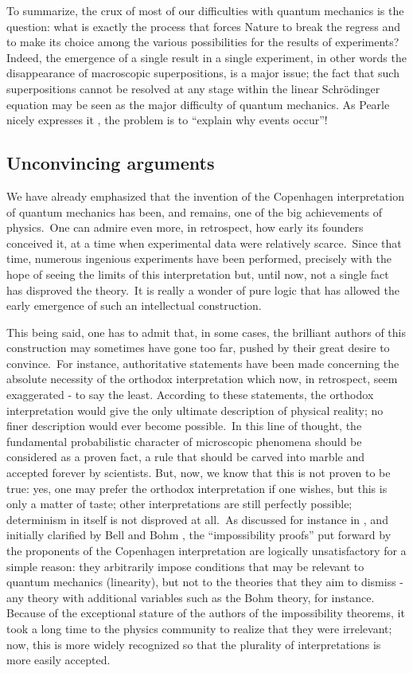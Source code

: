 \documentclass[12pt,onecolumn]{article}%
\begin{document}
To summarize, the crux of most of our difficulties with quantum mechanics is
the question: what is exactly the process that forces Nature to break the
regress and to make its choice among the various possibilities for the results
of experiments? Indeed, the emergence of a single result in a single
experiment, in other words the disappearance of macroscopic superpositions, is
a major issue; the fact that such superpositions cannot be resolved at any
stage within the linear Schr\"{o}dinger equation may be seen as the major
difficulty of quantum mechanics. As Pearle nicely expresses it \cite{Pearle-2}%
, the problem is to ``explain why events occur''!

\subsection{Unconvincing arguments}

We have already emphasized that the invention of the Copenhagen interpretation
of quantum mechanics has been, and remains, one of the big achievements of
physics.\ One can admire even more, in retrospect, how early its founders
conceived it, at a time when experimental data were relatively scarce.\ Since
that time, numerous ingenious experiments have been performed, precisely with
the hope of seeing the limits of this interpretation but, until now, not a
single fact has disproved the theory.\ It is really a wonder of pure logic
that has allowed the early emergence of such an intellectual construction.

This being said, one has to admit that, in some cases, the brilliant authors
of this construction may sometimes have gone too far, pushed by their great
desire to convince.\ For instance, authoritative statements have been made
concerning the absolute necessity of the orthodox interpretation which now, in
retrospect, seem exaggerated - to say the least. According to these
statements, the orthodox interpretation would give the only ultimate
description of physical reality; no finer description would ever become
possible.\ In this line of thought, the fundamental probabilistic character of
microscopic phenomena should be considered as a proven fact, a rule that
should be carved into marble and accepted forever by scientists. But, now, we
know that this is not proven to be true: yes, one may prefer the orthodox
interpretation if one wishes, but this is only a matter of taste; other
interpretations are still perfectly possible; determinism in itself is not
disproved at all.\ As discussed for instance in \cite{Mermin}, and initially
clarified by Bell \cite{Bell-1} \cite{Bell-livre} and Bohm \cite{Bohm-Bub-1}
\cite{Bohm-Bub-2} , the ``impossibility proofs'' put forward by the proponents
of the Copenhagen interpretation are logically unsatisfactory for a simple
reason: they arbitrarily impose conditions that may be relevant to quantum
mechanics (linearity), but not to the theories that they aim to dismiss - any
theory with additional variables such as the Bohm theory, for instance.
Because of the exceptional stature of the authors of the impossibility
theorems, it took a long time to the physics community to realize that they
were irrelevant; now, this is more widely recognized so that the plurality of
interpretations is more easily accepted.
\end{document}
